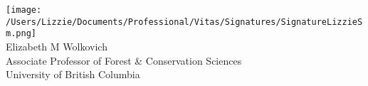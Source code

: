 \documentclass[11pt,a4paper]{letter}
\begin{document}
\begin{letter}{}
\texttt{[image: /Users/Lizzie/Documents/Professional/Vitas/Signatures/SignatureLizzieSm.png]} \\

Elizabeth M Wolkovich\\
Associate Professor of Forest \& Conservation Sciences\\ 
University of British Columbia
\end{letter}
\end{document}
